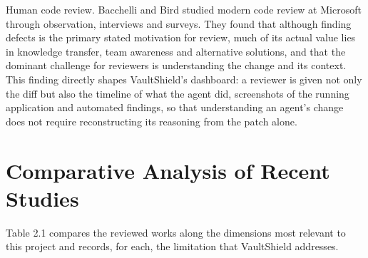 \documentclass[12pt,a4paper,oneside]{report}
\begin{document}
Human code review. Bacchelli and Bird \cite{ref14} studied modern code review at Microsoft through observation, interviews and surveys. They found that although finding defects is the primary stated motivation for review, much of its actual value lies in knowledge transfer, team awareness and alternative solutions, and that the dominant challenge for reviewers is understanding the change and its context. This finding directly shapes VaultShield's dashboard: a reviewer is given not only the diff but also the timeline of what the agent did, screenshots of the running application and automated findings, so that understanding an agent's change does not require reconstructing its reasoning from the patch alone.

\section{Comparative Analysis of Recent Studies}\label{comparative-analysis-of-recent-studies}

Table 2.1 compares the reviewed works along the dimensions most relevant to this project and records, for each, the limitation that VaultShield addresses.

\begingroup\small
\end{document}
